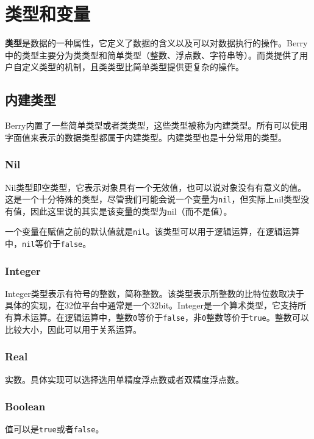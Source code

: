 \chapter{类型和变量}

\textbf{类型}是数据的一种属性，它定义了数据的含义以及可以对数据执行的操作。Berry中的类型主要分为类类型和简单类型（整数、浮点数、字符串等）。而类提供了用户自定义类型的机制，且类类型比简单类型提供更复杂的操作。

\section{内建类型}

Berry内置了一些简单类型或者类类型，这些类型被称为内建类型。所有可以使用字面值来表示的数据类型都属于内建类型。内建类型也是十分常用的类型。

\subsection{Nil}

Nil类型即空类型，它表示对象具有一个无效值，也可以说对象没有有意义的值。这是一个十分特殊的类型，尽管我们可能会说一个变量为\texttt{nil}，但实际上nil类型没有值，因此这里说的其实是该变量的类型为nil（而不是值）。

一个变量在赋值之前的默认值就是\texttt{nil}。该类型可以用于逻辑运算，在逻辑运算中，\texttt{nil}等价于\texttt{false}。

\subsection{Integer}

Integer类型表示有符号的整数，简称整数。该类型表示所整数的比特位数取决于具体的实现，在32位平台中通常是一个32bit。Integer是一个算术类型，它支持所有算术运算。在逻辑运算中，整数\texttt{0}等价于\texttt{false}，非\texttt{0}整数等价于\texttt{true}。整数可以比较大小，因此可以用于关系运算。

\subsection{Real}

实数。具体实现可以选择选用单精度浮点数或者双精度浮点数。

\subsection{Boolean}

值可以是\texttt{true}或者\texttt{false}。

